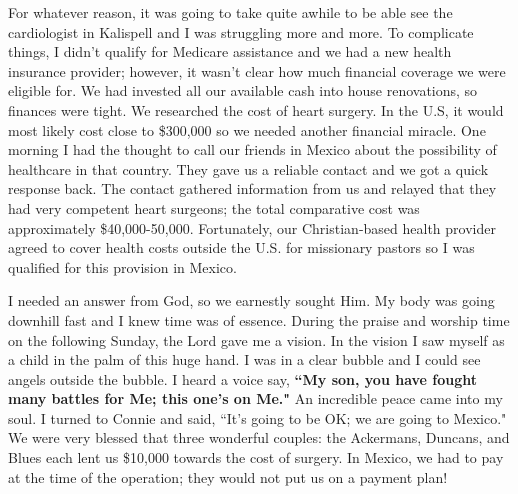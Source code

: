 \documentclass[oneside]{book}
\begin{document}
For whatever reason, it was going to take quite awhile to be able see the cardiologist in Kalispell and I was struggling more and more. To complicate things, I didn't qualify for Medicare assistance and we had a new health insurance provider; however, it wasn't clear how much financial coverage we were eligible for. We had invested all our available cash into house renovations, so finances were tight. We researched the cost of heart surgery. In the U.S, it would most likely cost close to \$300,000 so we needed another financial miracle. One morning I had the thought to call our friends in Mexico about the possibility of healthcare in that country. They gave us a reliable contact and we got a quick response back. The contact gathered information from us and relayed that they had very competent heart surgeons; the total comparative cost was approximately \$40,000-50,000. Fortunately, our Christian-based health provider agreed to cover health costs outside the U.S. for missionary pastors so I was qualified for this provision in Mexico. 

I needed an answer from God, so we earnestly sought Him. My body was going downhill fast and I knew time was of essence. During the praise and worship time on the following Sunday, the Lord gave me a vision. In the vision I saw myself as a child in the palm of this huge hand. I was in a clear bubble and I could see angels outside the bubble. I heard a voice say, \textbf{``My son, you have fought many battles for Me; this one's on Me."}  An incredible peace came into my soul. I turned to Connie and said, ``It's going to be OK; we are going to Mexico." We were very blessed that three wonderful couples: the Ackermans, Duncans, and Blues each lent us \$10,000 towards the cost of surgery. In Mexico, we had to pay at the time of the operation; they would not put us on a payment plan!
\end{document}
